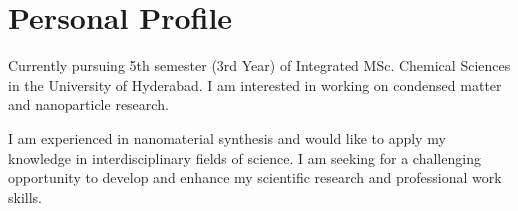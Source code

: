 
\section{Personal Profile}

Currently pursuing 5th semester (3rd Year) of Integrated MSc. Chemical Sciences in the University of Hyderabad. I am interested in working on condensed matter and nanoparticle research.

\vspace{1em}

I am experienced in nanomaterial synthesis and would like to apply my knowledge in interdisciplinary fields of science. I am seeking for a challenging opportunity to develop and enhance my scientific research and professional work skills.